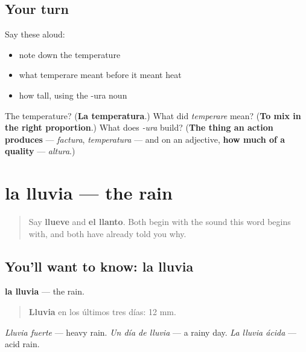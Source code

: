 \subsection*{Your turn}
Say these aloud:

\begin{itemize}
\raggedright
  \item note down the temperature
  \item what temperare meant before it meant heat
  \item how tall, using the -ura noun
\end{itemize}

\begin{tcolorbox}[breakable,colback=teal!4,colframe=teal!35!black,title={Before you move on}]
The temperature? (\textbf{La temperatura}.) What did \emph{temperare} mean? (\textbf{To mix in the right proportion}.) What does \emph{-ura} build? (\textbf{The thing an action produces} — \emph{factura}, \emph{temperatura} — and on an adjective, \textbf{how much of a quality} — \emph{altura}.)
\end{tcolorbox}
\section[la lluvia]{la lluvia — the rain}

\label{lesson:ES-C465-lluvia}



\begin{quote}
Say \textbf{llueve} and \textbf{el llanto}. Both begin with the sound this word begins with, and both have already told you why.
\end{quote}

\subsection*{You'll want to know: la lluvia}
\textbf{la lluvia} — the rain.

\begin{quote}
\textbf{Lluvia} en los últimos tres días: 12 mm.
\end{quote}

\emph{Lluvia fuerte} — heavy rain. \emph{Un día de lluvia} — a rainy day. \emph{La lluvia ácida} — acid rain.

